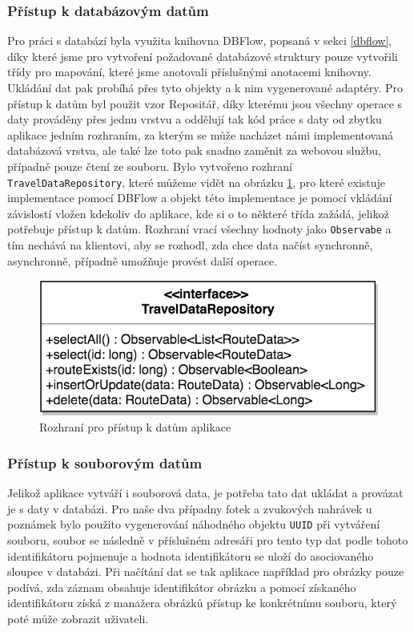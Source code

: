 \documentclass{article}
\begin{document}
\subsubsection{Přístup k databázovým datům}
Pro práci s databází byla využita knihovna DBFlow, popsaná v sekci \ref{dbflow}, díky které jsme pro vytvoření
požadované databázové struktury pouze vytvořili třídy pro mapování, které jsme anotovali příslušnými
anotacemi knihovny. Ukládání dat pak probíhá přes tyto objekty a k nim vygenerované adaptéry.
Pro přístup k datům byl použit vzor Repositář\cite{repository}, díky kterému
jsou všechny operace s daty prováděny přes jednu vrstvu a oddělují tak kód práce s daty od zbytku aplikace
jedním rozhraním, za kterým se může nacházet námi implementovaná databázová vrstva, ale také lze toto
pak snadno zaměnit za webovou službu, případně pouze čtení ze souboru.
Bylo vytvořeno rozhraní \texttt{TravelDataRepository}, které můžeme vidět na obrázku \ref{fig:traveldatarepo},
pro které existuje implementace pomocí DBFlow a objekt této implementace je pomocí vkládání závislostí vložen
kdekoliv do aplikace, kde si o to některé třída zažádá, jelikož potřebuje přístup k datům.
Rozhraní vrací všechny hodnoty jako \texttt{Observabe} a tím nechává na klientovi, aby se rozhodl, zda
chce data načíst synchronně, asynchronně, případně umožňuje provést další operace.

\begin{figure}[H]
        \centering
                \includegraphics[scale=0.2]{img/repo.png}
        \caption{Rozhraní pro přístup k datům aplikace}
        \label{fig:traveldatarepo}
\end{figure}

\subsubsection{Přístup k souborovým datům}
Jelikož aplikace vytváří i souborová data, je potřeba tato dat ukládat a provázat je s daty v databázi.
Pro naše dva případny fotek a zvukových nahrávek u poznámek bylo použito vygenerování náhodného
objektu \texttt{UUID} při vytváření souboru, soubor se následně v příslušném adresáři pro tento typ
dat podle tohoto identifikátoru pojmenuje a hodnota identifikátoru se uloží do asociovaného sloupce
v databázi. Při načítání dat se tak aplikace například pro obrázky pouze podívá, zda záznam obsahuje
identifikátor obrázku a pomocí získaného identifikátoru získá z manažera obrázků přístup ke konkrétnímu
souboru, který poté může zobrazit uživateli.
\end{document}
